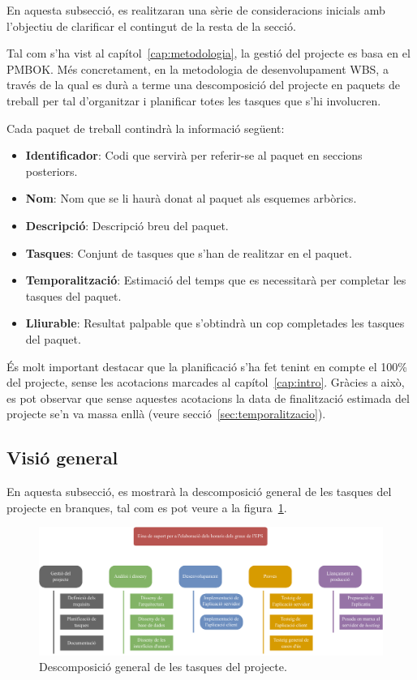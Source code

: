 \documentclass[a4paper,12pt]{ThesisStyle}
\begin{document}
En aquesta subsecció, es realitzaran una sèrie de consideracions inicials amb l'objectiu de clarificar el contingut de la resta de la secció.

Tal com s'ha vist al capítol~\ref{cap:metodologia}, la gestió del projecte es basa en el PMBOK. Més concretament, en la metodologia de desenvolupament WBS, a través de la qual es durà a terme una descomposició del projecte en paquets de treball per tal d'organitzar i planificar totes les tasques que s'hi involucren.

Cada paquet de treball contindrà la informació següent:
\begin{itemize}
  \item \textbf{Identificador}: Codi que servirà per referir-se al paquet en seccions posteriors.
  \item \textbf{Nom}: Nom que se li haurà donat al paquet als esquemes arbòrics.
  \item \textbf{Descripció}: Descripció breu del paquet.
  \item \textbf{Tasques}: Conjunt de tasques que s'han de realitzar en el paquet.
  \item \textbf{Temporalització}: Estimació del temps que es necessitarà per completar les tasques del paquet.
  \item \textbf{Lliurable}: Resultat palpable que s'obtindrà un cop completades les tasques del paquet.
\end{itemize}

És molt important destacar que la planificació s'ha fet tenint en compte el 100\% del projecte, sense les acotacions marcades al capítol~\ref{cap:intro}. Gràcies a això, es pot observar que sense aquestes acotacions la data de finalització estimada del projecte se'n va massa enllà (veure secció~\ref{sec:temporalitzacio}).

\subsection{Visió general}
\label{subsec:visio_general}

En aquesta subsecció, es mostrarà la descomposició general de les tasques del projecte en branques, tal com es pot veure a la figura~\ref{img:pt_general}.

\begin{figure}[H]
	\centering
	\includegraphics[width=\textwidth]{assets/working_packages/general.pdf}
	\caption{\label{img:pt_general}Descomposició general de les tasques del projecte.}
\end{figure}
\end{document}
